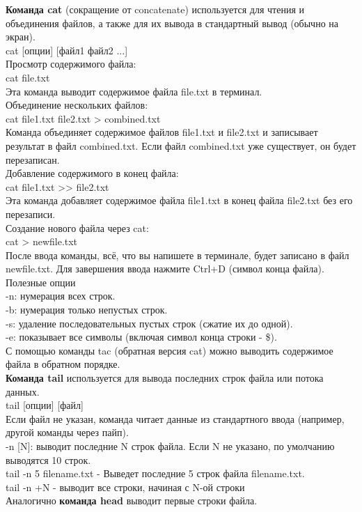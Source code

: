 \noindent \textbf{Команда cat} (сокращение от concatenate) используется для чтения и объединения файлов, а также для их вывода в стандартный вывод (обычно на экран). \\
cat [опции] [файл1 файл2 ...] \\
Просмотр содержимого файла: \\
cat file.txt \\
Эта команда выводит содержимое файла file.txt в терминал. \\
Объединение нескольких файлов: \\
cat file1.txt file2.txt > combined.txt \\
Команда объединяет содержимое файлов file1.txt и file2.txt и записывает результат в файл combined.txt. Если файл combined.txt уже существует, он будет перезаписан. \\
Добавление содержимого в конец файла: \\
cat file1.txt >\!> file2.txt \\
Эта команда добавляет содержимое файла file1.txt в конец файла file2.txt без его перезаписи. \\
Создание нового файла через cat: \\
cat > newfile.txt \\
После ввода команды, всё, что вы напишете в терминале, будет записано в файл newfile.txt. Для завершения ввода нажмите Ctrl+D (символ конца файла). \\
Полезные опции \\
-n: нумерация всех строк. \\
-b: нумерация только непустых строк. \\
-s: удаление последовательных пустых строк (сжатие их до одной). \\
-e: показывает все символы (включая символ конца строки - \$). \\
С помощью команды tac (обратная версия cat) можно выводить содержимое файла в обратном порядке. \\

\noindent \textbf{Команда tail} используется для вывода последних строк файла или потока данных. \\
tail [опции] [файл] \\
Если файл не указан, команда читает данные из стандартного ввода (например, другой команды через пайп). \\
-n [N]: выводит последние N строк файла. Если N не указано, по умолчанию выводятся 10 строк. \\
tail -n 5 filename.txt - Выведет последние 5 строк файла filename.txt. \\
tail -n +N - выводит все строки, начиная с N-ой строки  \\
Аналогично \textbf{команда head} выводит первые строки файла. \\

